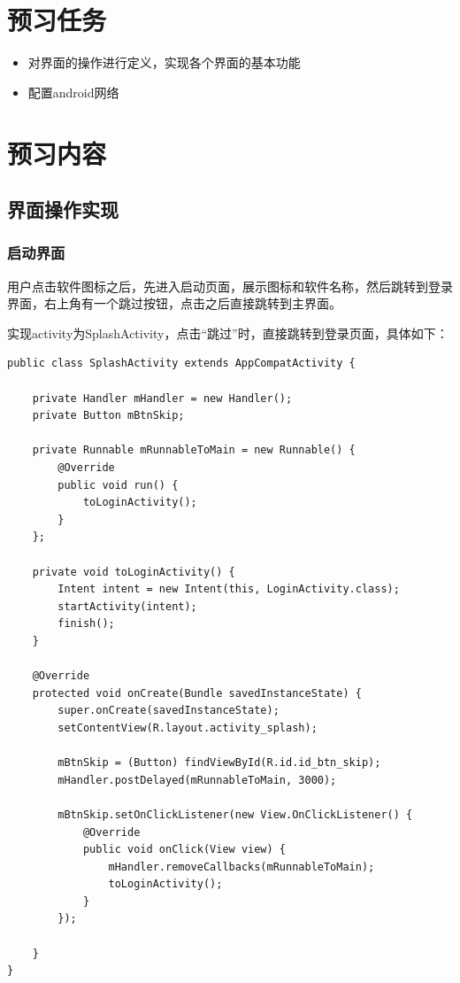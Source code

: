 \documentclass[UTF8,12pt]{article}
\newcommand\myemptypage{
    \null
    \thispagestyle{empty}
    \addtocounter{page}{-1}
    \newpage
}
\begin{document}
\begin{titlepage}
    
\end{titlepage}

\myemptypage

\begin{center}
    \tableofcontents
\end{center}
\newpage

\section{预习任务}
\begin{itemize}
    \item 对界面的操作进行定义，实现各个界面的基本功能
    \item 配置android网络
\end{itemize}

\section{预习内容}

\subsection{界面操作实现}
\subsubsection{启动界面}
用户点击软件图标之后，先进入启动页面，展示图标和软件名称，然后跳转到登录界面，右上角有一个跳过按钮，点击之后直接跳转到主界面。

实现activity为SplashActivity，点击“跳过”时，直接跳转到登录页面，具体如下：

\begin{lstlisting}[frame=shadowbox]
    public class SplashActivity extends AppCompatActivity {

    private Handler mHandler = new Handler();
    private Button mBtnSkip;

    private Runnable mRunnableToMain = new Runnable() {
        @Override
        public void run() {
            toLoginActivity();
        }
    };

    private void toLoginActivity() {
        Intent intent = new Intent(this, LoginActivity.class);
        startActivity(intent);
        finish();
    }

    @Override
    protected void onCreate(Bundle savedInstanceState) {
        super.onCreate(savedInstanceState);
        setContentView(R.layout.activity_splash);

        mBtnSkip = (Button) findViewById(R.id.id_btn_skip);
        mHandler.postDelayed(mRunnableToMain, 3000);

        mBtnSkip.setOnClickListener(new View.OnClickListener() {
            @Override
            public void onClick(View view) {
                mHandler.removeCallbacks(mRunnableToMain);
                toLoginActivity();
            }
        });

    }
}

\end{lstlisting}
\end{document}

